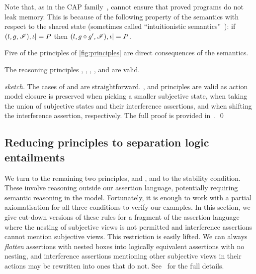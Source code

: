 Note that, as in the CAP family~\cite{cap-ecoop10,icap,tada}, \colosl
cannot ensure that proved programs do not leak memory. This is because
of the following property of the semantics with respect to the shared
state (sometimes called ``intuitionistic semantics''~\cite{rey02}): if
$(l,g,\mathscr{I}), \iota |= P$ then $(l,g\circ g',\mathscr{I}), \iota |= P$.


Five of the principles of \fig\ref{fig:principles} are direct
consequences of the semantics.

\begin{lemma}
  \label{lem:assertion-facts}
  The \colosl reasoning principles 
  \forgetRule, \mergeRule, \shiftRule, \weakenRule, and \copyRule are valid.
\end{lemma}
\begin{proof}[sketch]
  The cases of \weakenRule and \copyRule are
  straightforward. \forgetRule, \mergeRule and \shiftRule principles are valid as action
  model closure is preserved when picking a smaller subjective state, when taking the union of subjective states and their interference assertions, and when shifting the interference assertion, respectively. The full proof is provided in~\cite{colosl-tr14}.
  \qed
\end{proof}


\subsection{Reducing \colosl principles to separation logic entailments}
\label{subsec:prules}

We turn to the remaining two principles, \extendRule and \shiftRule,
and to the stability condition. These involve reasoning outside our
assertion language, potentially requiring semantic reasoning 
in the model. Fortunately, it is enough to work
with a partial 
axiomatisation  for all three conditions to verify
our examples. In this section, we give cut-down versions of these
rules for a fragment of the \colosl assertion language where the 
nesting of subjective views is not permitted   and  interference
assertions cannot mention subjective views. This restriction is easily
lifted. We can always \emph{flatten}
assertions with nested boxes into logically equivalent assertions with
no nesting, and  interference assertions  mentioning  other
subjective views in their actions may be rewritten into ones
that do not.  See~\cite{colosl-tr14} for the full details.%

